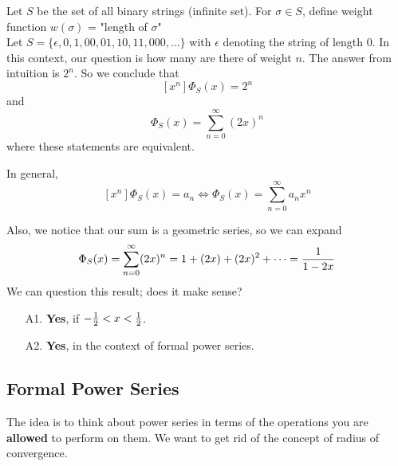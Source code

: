 \documentclass[english, 11pt]{article}
\begin{document}
   \begin{exmp}
     Let $S$ be the set of all binary strings (infinite set). For $\sigma \in S$, define weight function $w(\sigma)$ = "length of $\sigma$" \\

     Let $S = \{ \epsilon, 0,1,00,01,10,11,000,\ldots \}$ with $\epsilon$ denoting the string of length 0. In this context, our question is how many  are there of weight $n$. The answer from intuition is $2^n$. So we conclude that
     \[ [x^n]\Phi_S(x) = 2^n \]
     and
     \[ \Phi_S(x) = \sum_{n=0}^{\infty} (2x)^n \]
     where these statements are equivalent.
     \begin{note}
       In general,
     \[ [x^n]\Phi_S(x) = a_n \iff \Phi_S(x) = \sum_{n=0}^{\infty} a_nx^n \]
     \end{note}
     Also, we notice that our sum is a geometric series, so we can expand
     \[ \Phi_S(x) = \sum_{n=0}^{\infty} (2x)^n = 1 + (2x) + (2x)^2 + \cdots = \frac{1}{1-2x}  \]
     We can question this result; does it make sense?
     \begin{itemize}
       \item[A1.] \textbf{Yes}, if $-\frac{1}{2} < x < \frac{1}{2}$.
       \item[A2.] \textbf{Yes}, in the context of formal power series.
     \end{itemize}
   \end{exmp}

   \subsection{Formal Power Series}

   The idea is to think about power series in terms of the operations you are \textbf{allowed} to perform on them. We want to get rid of the concept of radius of convergence.
\end{document}
